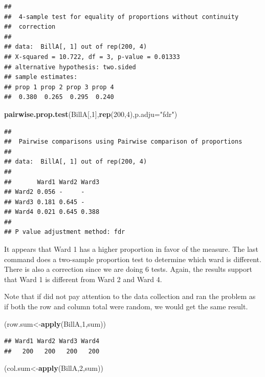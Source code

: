 \documentclass[]{book}
\newenvironment{Shaded}{\begin{snugshade}}{\end{snugshade}}
\newcommand{\KeywordTok}[1]{\textcolor[rgb]{0.13,0.29,0.53}{\textbf{#1}}}
\newcommand{\DataTypeTok}[1]{\textcolor[rgb]{0.13,0.29,0.53}{#1}}
\newcommand{\DecValTok}[1]{\textcolor[rgb]{0.00,0.00,0.81}{#1}}
\newcommand{\StringTok}[1]{\textcolor[rgb]{0.31,0.60,0.02}{#1}}
\newcommand{\NormalTok}[1]{#1}
\theoremstyle{definition}
\theoremstyle{definition}
\theoremstyle{definition}
\theoremstyle{remark}
\begin{document}
\begin{verbatim}
## 
##  4-sample test for equality of proportions without continuity
##  correction
## 
## data:  BillA[, 1] out of rep(200, 4)
## X-squared = 10.722, df = 3, p-value = 0.01333
## alternative hypothesis: two.sided
## sample estimates:
## prop 1 prop 2 prop 3 prop 4 
##  0.380  0.265  0.295  0.240
\end{verbatim}

\begin{Shaded}
\begin{Highlighting}[]
\KeywordTok{pairwise.prop.test}\NormalTok{(BillA[,}\DecValTok{1}\NormalTok{],}\KeywordTok{rep}\NormalTok{(}\DecValTok{200}\NormalTok{,}\DecValTok{4}\NormalTok{),}\DataTypeTok{p.adju=}\StringTok{"fdr"}\NormalTok{)}
\end{Highlighting}
\end{Shaded}

\begin{verbatim}
## 
##  Pairwise comparisons using Pairwise comparison of proportions 
## 
## data:  BillA[, 1] out of rep(200, 4) 
## 
##       Ward1 Ward2 Ward3
## Ward2 0.056 -     -    
## Ward3 0.181 0.645 -    
## Ward4 0.021 0.645 0.388
## 
## P value adjustment method: fdr
\end{verbatim}

It appears that Ward 1 has a higher proportion in favor of the measure.
The last command does a two-sample proportion test to determine which
ward is different. There is also a correction since we are doing 6
tests. Again, the results support that Ward 1 is different from Ward 2
and Ward 4.

Note that if did not pay attention to the data collection and ran the
problem as if both the row and column total were random, we would get
the same result.

\begin{Shaded}
\begin{Highlighting}[]
\NormalTok{(row.sum<-}\KeywordTok{apply}\NormalTok{(BillA,}\DecValTok{1}\NormalTok{,sum))}
\end{Highlighting}
\end{Shaded}

\begin{verbatim}
## Ward1 Ward2 Ward3 Ward4 
##   200   200   200   200
\end{verbatim}

\begin{Shaded}
\begin{Highlighting}[]
\NormalTok{(col.sum<-}\KeywordTok{apply}\NormalTok{(BillA,}\DecValTok{2}\NormalTok{,sum))}
\end{Highlighting}
\end{Shaded}
\end{document}
